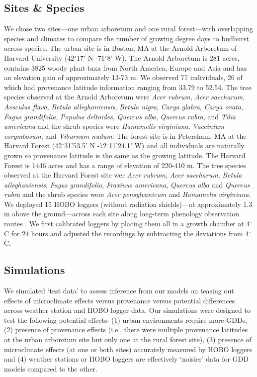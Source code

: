 \documentclass{article}\usepackage[]{graphicx}\usepackage[]{color}
\begin{document}
\subsection*{Sites \& Species}
We chose two sites---one urban arboretum and one rural forest---with overlapping species and climates to compare the number of growing degree days to budburst across species. The urban site is in Boston, MA at the Arnold Arboretum of Harvard University (42$^{\circ}$17' N -71$^{\circ}$8' W). The Arnold Arboretum is 281 acres, contains 3825 woody plant taxa from North America, Europe and Asia and has an elevation gain of approximately 13-73 m. We observed 77 individuals, 26 of which had provenance latitude information ranging from 33.79 to 52.54. The tree species observed at the Arnold Arboretum were \textit{Acer rubrum}, \textit{Acer saccharum}, \textit{Aesculus flava}, \textit{Betula alleghaniensis}, \textit{Betula nigra}, \textit{Carya glabra}, \textit{Carya ovata}, \textit{Fagus grandifolia}, \textit{Populus deltoides}, \textit{Quercus alba}, \textit{Quercus rubra}, and \textit{Tilia americana} and the shrub species were \textit{Hamamelis virginiana}, \textit{Vaccinium corymbosum}, and \textit{Viburnum nudum}. The forest site is in Petersham, MA at the Harvard Forest (42$^{\circ}$31'53.5' N -72$^{\circ}$11'24.1' W) and all individuals are naturally grown so provenance latitude is the same as the growing latitude. The Harvard Forest is 1446 acres and has a range of elevation of 220-410 m. The tree species observed at the Harvard Forest site wer \textit{Acer rubrum}, \textit{Acer saccharum}, \textit{Betula alleghaniensis},  \textit{Fagus grandifolia}, \textit{Fraxinus americana}, \textit{Quercus alba} and \textit{Quercus rubra} and the shrub species were \textit{Acer pensylvanicum} and \textit{Hamamelis virginiana}. We deployed 15 HOBO loggers (without radiation shields)---at approximately 1.3 m above the ground---across each site along long-term phenology observation routes \citep{OKeefe2014}. We first calibrated loggers by placing them all in a growth chamber at 4$^{\circ}$C for 24 hours and adjusted the recordings by subtracting the deviations from 4$^{\circ}$C. 

\subsection*{Simulations}
We simulated `test data' to assess inference from our models on teasing out effects of microclimate effects versus provenance versus potential differences across weather station and HOBO logger data. Our simulations were designed to test the following potential effects: (1) urban environments require more GDDs, (2) presence of provenance effects (i.e., there were multiple provenance latitudes at the urban arboretum site but only one at the rural forest site), (3) presence of microclimate effects (at one or both sites) accurately measured by HOBO loggers and (4) weather stations or HOBO loggers are effectively `noisier' data for GDD models compared to the other. 
\end{document}
